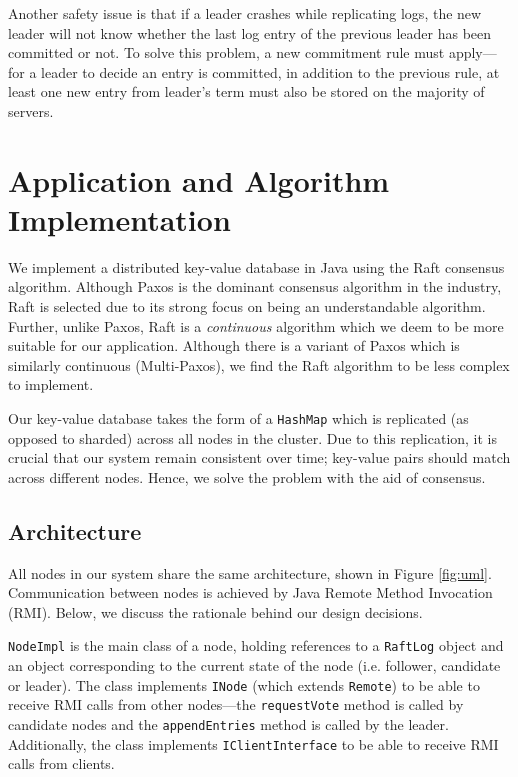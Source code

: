 \documentclass[12pt, a4paper]{article}
\begin{document}
  Another safety issue is that if a leader crashes while replicating logs, the new leader will not know whether the last log entry of the previous leader has been committed or not. To solve this problem, a new commitment rule must apply---for a leader to decide an entry is committed, in addition to the previous rule, at least one new entry from leader's term must also be stored on the majority of servers.


\section{Application and Algorithm Implementation} \label{sec:application}
We implement a distributed key-value database in Java using the Raft consensus algorithm. Although Paxos is the dominant consensus algorithm in the industry, Raft is selected due to its strong focus on being an understandable algorithm. Further, unlike Paxos, Raft is a \textit{continuous} algorithm which we deem to be more suitable for our application. Although there is a variant of Paxos which is similarly continuous (Multi-Paxos), we find the Raft algorithm to be less complex to implement.

Our key-value database takes the form of a \texttt{HashMap} which is replicated (as opposed to sharded) across all nodes in the cluster. Due to this replication, it is crucial that our system remain consistent over time; key-value pairs should match across different nodes. Hence, we solve the problem with the aid of consensus.

\subsection{Architecture}
All nodes in our system share the same architecture, shown in Figure \ref{fig:uml}. Communication between nodes is achieved by Java Remote Method Invocation (RMI). Below, we discuss the rationale behind our design decisions.

\texttt{NodeImpl} is the main class of a node, holding references to a \texttt{RaftLog} object and an object corresponding to the current state of the node (i.e. follower, candidate or leader). The class implements \texttt{INode} (which extends \texttt{Remote}) to be able to receive RMI calls from other nodes---the \texttt{requestVote} method is called by candidate nodes and the \texttt{appendEntries} method is called by the leader. Additionally, the class implements \texttt{IClientInterface} to be able to receive RMI calls from clients.
\end{document}
